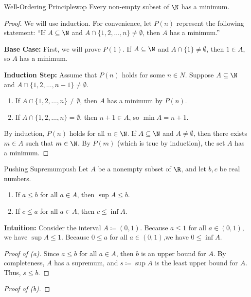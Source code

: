 \begin{thmbox}{Well-Ordering Principle}{wop}
    Every non-empty subset of $\N$ has a minimum.
    \tcblower
    \begin{proof}
        We will use induction. For convenience, let $P(n)$ represent the following statement: ``If $A \subseteq \N$ and $A \cap \{1,2,\ldots,n \} \neq \emptyset$, then $A$ has a minimum.''

        \textbf{Base Case:} First, we will prove $P(1)$. If $A \subseteq \N$ and $A \cap \{1\} \neq \emptyset$, then $1 \in A$, so $A$ has a minimum.

        \textbf{Induction Step:} Assume that $P(n)$ holds for some $n \in N$. Suppose $A \subseteq \N$ and $A \cap \{1,2,\ldots,n+1\} \neq \emptyset$.
        \begin{enumerate}
            \item If $A \cap \{ 1,2,\ldots,n \} \neq \emptyset$, then $A$ has a minimum by $P(n)$.
            \item If $A \cap \{1,2,\ldots,n\} = \emptyset$, then $n+1 \in A$, so $\min A = n+1$.
        \end{enumerate}
        By induction, $P(n)$ holds for all $n \in \N$. If $A \subseteq \N$ and $A \neq \emptyset$, then there exists $m \in A$ such that $m \in \N$. By $P(m)$ (which is true by induction), the set $A$ has a minimum.
    \end{proof}
\end{thmbox}

\begin{thmbox}{Pushing Supremum}{push}
    Let $A$ be a nonempty subset of $\R$, and let $b,c$ be real numbers.
    \begin{enumerate}[noitemsep, label=(\alph*)]
        \item If $a \leq b$ for all $a \in A$, then $\sup A \leq b$.
        \item If $c \leq a$ for all $a \in A$, then $c \leq \inf A$.
    \end{enumerate}
    \tcblower
    \textbf{Intuition:} Consider the interval $A \coloneq (0,1)$. Because $a \leq 1$ for all $a \in (0,1)$, we have $\sup A \leq 1$. Because $0 \leq a$ for all $a \in (0,1)$,we have $0 \leq \inf A$.
    \begin{proof}[Proof of (a)]
        Since $a \leq b$ for all $a \in A$, then $b$ is an upper bound for $A$. By completeness, $A$ has a supremum, and $s \coloneq \sup A$ is the least upper bound for $A$. Thus, $s \leq b$.
    \end{proof}
    \begin{proof}[Proof of (b)]

    \end{proof}
\end{thmbox}

